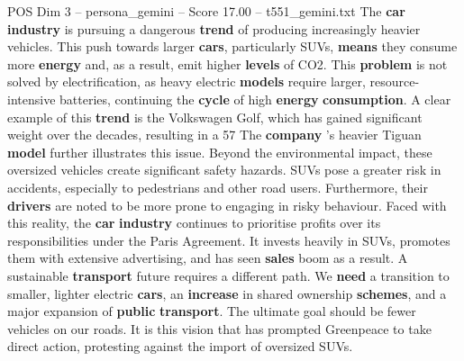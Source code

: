 \begin{textsample}{POS Dim 3 – persona\_gemini – Score 17.00 – t551\_gemini.txt}  \label{ex:f3_pos_049}
The \textbf{car} \textbf{industry} is pursuing a dangerous \textbf{trend} of producing increasingly heavier vehicles.
This push towards larger \textbf{cars}, particularly SUVs, \textbf{means} they consume more \textbf{energy} and, as a result, emit higher \textbf{levels} of CO2.
This \textbf{problem} is not solved by electrification, as heavy electric \textbf{models} require larger, resource-intensive batteries, continuing the \textbf{cycle} of high \textbf{energy} \textbf{consumption}.
A clear example of this \textbf{trend} is the Volkswagen Golf, which has gained significant weight over the decades, resulting in a 57 %
The \textbf{company} 's heavier Tiguan \textbf{model} further illustrates this issue.
Beyond the environmental impact, these oversized vehicles create significant safety hazards.
SUVs pose a greater risk in accidents, especially to pedestrians and other road users.
Furthermore, their \textbf{drivers} are noted to be more prone to engaging in risky behaviour.
Faced with this reality, the \textbf{car} \textbf{industry} continues to prioritise profits over its responsibilities under the Paris Agreement.
It invests heavily in SUVs, promotes them with extensive advertising, and has seen \textbf{sales} boom as a result.
A sustainable \textbf{transport} future requires a different path.
We \textbf{need} a transition to smaller, lighter electric \textbf{cars}, an \textbf{increase} in shared ownership \textbf{schemes}, and a major expansion of \textbf{public} \textbf{transport}.
The ultimate goal should be fewer vehicles on our roads.
It is this vision that has prompted Greenpeace to take direct action, protesting against the import of oversized SUVs.

\end{textsample}
